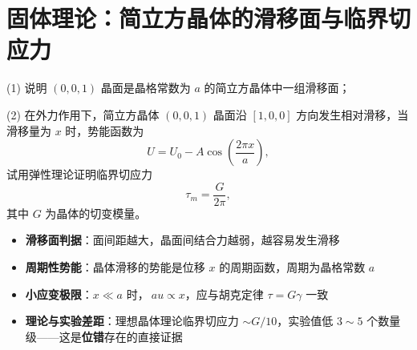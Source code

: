 \section{固体理论：简立方晶体的滑移面与临界切应力}
\label{sec:slip-plane-critical-stress}

\begin{modelbox}[题目：滑移面判定与临界切应力的理论推导]
(1) 说明 $(0,0,1)$ 晶面是晶格常数为 $a$ 的简立方晶体中一组滑移面；

(2) 在外力作用下，简立方晶体 $(0,0,1)$ 晶面沿 $[1,0,0]$ 方向发生相对滑移，当滑移量为 $x$ 时，势能函数为
\begin{equation}
U = U_0 - A\cos\!\left(\frac{2\pi x}{a}\right),
\end{equation}
试用弹性理论证明临界切应力
\begin{equation}
\tau_m = \frac{G}{2\pi},
\end{equation}
其中 $G$ 为晶体的切变模量。
\end{modelbox}

\begin{tipbox}[考点快速分析]
\begin{itemize}
    \item \textbf{滑移面判据}：面间距越大，晶面间结合力越弱，越容易发生滑移
    \item \textbf{周期性势能}：晶体滑移的势能是位移 $x$ 的周期函数，周期为晶格常数 $a$
    \item \textbf{小应变极限}：$x\ll a$ 时，$\	au\propto x$，应与胡克定律 $\tau=G\gamma$ 一致
    \item \textbf{理论与实验差距}：理想晶体理论临界切应力 $\sim G/10$，实验值低 $3\sim 5$ 个数量级——这是\textbf{位错}存在的直接证据
\end{itemize}
\end{tipbox}

